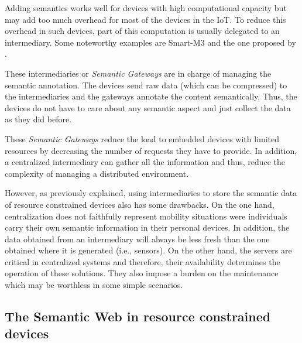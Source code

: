
Adding semantics works well for devices with high computational capacity but may add too much overhead for most of the devices in the IoT.
To reduce this overhead in such devices, part of this computation is usually delegated to an intermediary.
Some noteworthy examples are Smart-M3 \citep{honkola_smart-m3_2010} and the one proposed by \citet{broring_semantic_2009}.

These intermediaries or \emph{Semantic Gateways} are in charge of managing the semantic annotation.
The devices send raw data (which can be compressed) to the intermediaries and the gateways annotate the content semantically.
Thus, the devices do not have to care about any semantic aspect and just collect the data as they did before.

These \emph{Semantic Gateways} reduce the load to embedded devices with limited resources by decreasing the number of requests they have to provide.
In addition, a centralized intermediary can gather all the information and thus, reduce the complexity of managing a distributed environment.

However, as previously explained, using intermediaries to store the semantic data of resource constrained devices also has some drawbacks.
On the one hand, centralization does not faithfully represent mobility situations were individuals carry their own semantic information in their personal devices.
In addition, the data obtained from an intermediary will always be less fresh than the one obtained where it is generated (i.e., sensors).
On the other hand, the servers are critical in centralized systems and therefore, their availability determines the operation of these solutions.
They also impose a burden on the maintenance which may be worthless in some simple scenarios.


\subsection{The Semantic Web in resource constrained devices}


